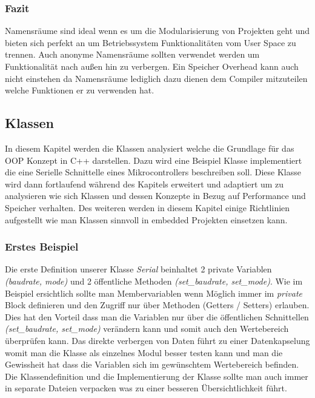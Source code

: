\documentclass[MES,Master,ngerman]{twbook}%
\begin{document}
\subsubsection{Fazit}
Namensräume sind ideal wenn es um die Modularisierung von Projekten geht und bieten sich perfekt an um Betriebssystem Funktionalitäten vom User Space zu trennen. Auch anonyme Namensräume sollten verwendet werden um Funktionalität nach außen hin zu verbergen. Ein Speicher Overhead kann auch nicht einstehen da Namensräume lediglich dazu dienen dem Compiler mitzuteilen welche Funktionen er zu verwenden hat.
\newpage

\subsection{Klassen}
In diesem Kapitel werden die Klassen analysiert welche die Grundlage für das OOP Konzept in C++ darstellen. Dazu wird eine Beispiel Klasse implementiert die eine Serielle Schnittelle eines Mikrocontrollers beschreiben soll. Diese Klasse wird dann fortlaufend während des Kapitels erweitert und adaptiert um zu analysieren wie sich Klassen und dessen Konzepte in Bezug auf Performance und Speicher verhalten. Des weiteren werden in diesem Kapitel einige Richtlinien aufgestellt wie man Klassen sinnvoll in embedded Projekten einsetzen kann. 
\subsubsection{Erstes Beispiel}
Die erste Definition unserer Klasse \textit{Serial} beinhaltet 2 private Variablen \textit{(baudrate, mode)} und 2 öffentliche Methoden \textit{(set\_baudrate, set\_mode)}. Wie im Beispiel ersichtlich sollte man Membervariablen wenn Möglich immer im \textit{private} Block definieren und den Zugriff nur über Methoden (Getters / Setters) erlauben. Dies hat den Vorteil dass man die Variablen nur über die öffentlichen Schnittellen \textit{(set\_baudrate, set\_mode)} verändern kann und somit auch den Wertebereich überprüfen kann. Das direkte verbergen von Daten führt zu einer Datenkapselung womit man die Klasse als einzelnes Modul besser testen kann und man die Gewissheit hat dass die Variablen sich im gewünschtem Wertebereich befinden. Die Klassendefinition und die Implementierung der Klasse sollte man auch immer in separate Dateien verpacken was zu einer besseren Übersichtlichkeit führt. \newline 
\begin{figure}[!htb]
	\begin{subfigure}[b]{0.5\textwidth}
		
		\label{fig:19}
	\end{subfigure}
	\begin{subfigure}[b]{0.5\textwidth}
		
		\label{fig:20}
	\end{subfigure}
\end{figure}
\end{document}
